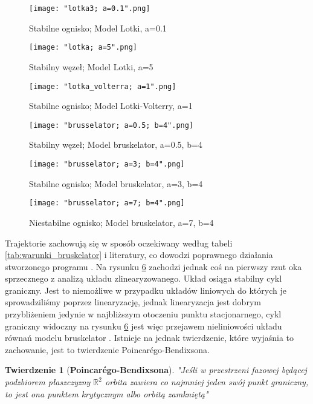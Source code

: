 \documentclass[10pt, a4paper, twoside, onecolumn]{article}
\numberwithin{equation}{section}
\newtheorem*{theorem}{Twierdzenie}
\begin{document}
	\begin{figure}[H]
		\centering
		\texttt{[image: "lotka3; a=0.1".png]}
		\caption{Stabilne ognisko; Model Lotki, a=0.1}
		\label{fig:stabilne_ognisko_lotka}
	\end{figure}
	\begin{figure}[H]
		\centering
		\texttt{[image: "lotka; a=5".png]}
		\caption{Stabilny węzeł; Model Lotki, a=5}
		\label{fig:stabilny_wezel_lotka}
	\end{figure}
	\begin{figure}[H]
		\centering
		\texttt{[image: "lotka\_volterra; a=1".png]}
		\caption{Stabilne ognisko; Model Lotki-Volterry, a=1}
		\label{fig:stabilne_ognisko_lotka_volterra}
	\end{figure}
	\begin{figure}[H]
		\centering
		\texttt{[image: "brusselator; a=0.5; b=4".png]}
		\caption{Stabilny węzeł; Model bruskelator, a=0.5, b=4}
		\label{fig:stabilny_wezel}
	\end{figure}
	\begin{figure}[H]
		\centering
		\texttt{[image: "brusselator; a=3; b=4".png]}
		\caption{Stabilne ognisko; Model bruskelator, a=3, b=4}
		\label{fig:stabilne_ognisko}
	\end{figure}
	\begin{figure}[H]
		\centering
		\texttt{[image: "brusselator; a=7; b=4".png]}
		\caption{Niestabilne ognisko; Model bruskelator, a=7, b=4}
		\label{fig:niestabilne_ognisko}
	\end{figure}\newpage
	Trajektorie zachowują się w sposób oczekiwany według tabeli \ref{tab:warunki_bruskelator} i literatury, co dowodzi poprawnego działania stworzonego programu \cite{orlik}. Na rysunku \ref{fig:niestabilne_ognisko} zachodzi jednak coś na pierwszy rzut oka sprzecznego z analizą układu zlinearyzowanego. Układ osiąga stabilny cykl graniczny. Jest to niemożliwe w przypadku układów liniowych do których je sprowadziliśmy poprzez linearyzację, jednak linearyzacja jest dobrym przybliżeniem jedynie w najbliższym otoczeniu punktu stacjonarnego, cykl graniczny widoczny na rysunku \ref{fig:niestabilne_ognisko} jest więc przejawem nieliniowości układu równań modelu bruskelator \cite{orlik}. Istnieje na jednak twierdzenie, które wyjaśnia to zachowanie, jest to twierdzenie Poincar\'{e}go-Bendixsona. \par
	\begin{theorem}[\textbf{Poincar\'{e}go-Bendixsona}]
		"Jeśli w przestrzeni fazowej będącej podzbiorem płaszczyzny \(\mathbb{R}^{2}\) orbita zawiera co najmniej jeden swój punkt graniczny, to jest ona punktem krytycznym albo orbitą zamkniętą" \cite{palczewski}
	\end{theorem}
\end{document}
